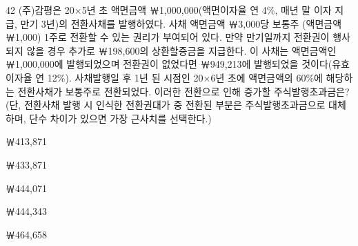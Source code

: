 \begin{question}{42}
(주)감평은 20×5년 초 액면금액 ￦1,000,000(액면이자율 연 4\%, 매년 말 이자 지급, 만기 3년)의 전환사채를 발행하였다. 사채 액면금액 ￦3,000당 보통주 (액면금액 ￦1,000) 1주로 전환할 수 있는 권리가 부여되어 있다. 만약 만기일까지 전환권이 행사되지 않을 경우 추가로 ￦198,600의 상환할증금을 지급한다. 이 사채는 액면금액인 ￦1,000,000에 발행되었으며 전환권이 없었다면 ￦949,213에 발행되었을 것이다(유효이자율 연 12\%). 사채발행일 후 1년 된 시점인 20×6년 초에 액면금액의 60\%에 해당하는 전환사채가 보통주로 전환되었다. 이러한 전환으로 인해 증가할 주식발행초과금은? (단, 전환사채 발행 시 인식한 전환권대가 중 전환된 부분은 주식발행초과금으로 대체하며, 단수 차이가 있으면 가장 근사치를 선택한다.)
\begin{choices}
  \item ￦413,871
  \item ￦433,871
  \item ￦444,071
  \item ￦444,343
  \item ￦464,658
\end{choices}
\end{question}

